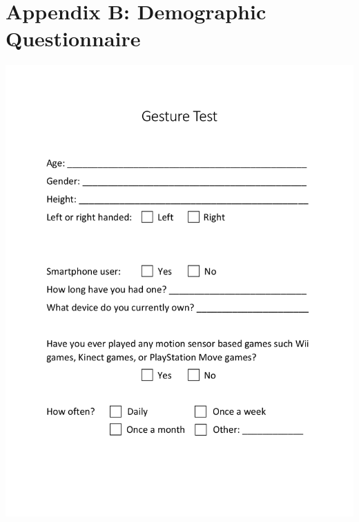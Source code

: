\section*{Appendix B: Demographic Questionnaire}
\begin{adjustbox}{width=1\textwidth}
	\includegraphics{images/demographics.pdf}
\end{adjustbox}

